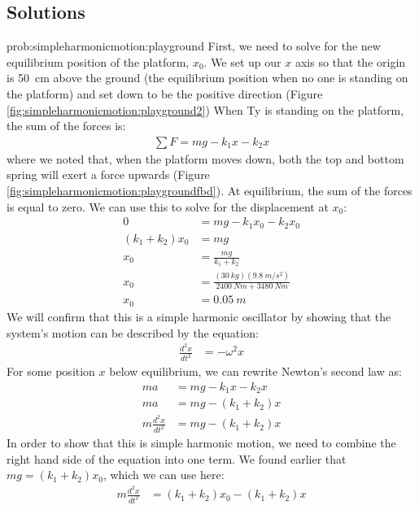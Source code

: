 \subsection{Solutions}
\begin{solution}{prob:simpleharmonicmotion:playground}\label{soln:simpleharmonicmotion:playground}
First, we need to solve for the new equilibrium position of the platform, $x_0$. We set up our $x$ axis so that the origin is \SI{50}{cm} above the ground (the equilibrium position when no one is standing on the platform) and set down to be the positive direction (Figure \ref{fig:simpleharmonicmotion:playground2})
When Ty is standing on the platform, the sum of the forces is:
\begin{align*}
\sum F=mg-k_1x-k_2x
\end{align*}
where we noted that, when the platform moves down, both the top and bottom spring will exert a force upwards (Figure \ref{fig:simpleharmonicmotion:playgroundfbd}). 
At equilibrium, the sum of the forces is equal to zero. 
We can use this to solve for the displacement at $x_0$:
\begin{align*}
0&=mg-k_1x_0-k_2x_0\\
(k_1+k_2)x_0&=mg\\
x_0&=\frac{mg}{k_1+k_2}\\
x_0&=\frac{(\SI{30}{kg})(\SI{9.8}{m/s^2})}{\SI{2400}{Nm}+\SI{3480}{Nm}}\\
x_0&=\SI{0.05}{m}
\end{align*}
We will confirm that this is a simple harmonic oscillator by showing that the system's motion can be described by the equation:
\begin{align*}
\frac{d^2x}{dt^2}&=-\omega^2x
\end{align*}
For some position $x$ below equilibrium, we can rewrite Newton's second law as:
\begin{align*}
ma&=mg-k_1x-k_2x\\
ma&=mg-(k_1+k_2)x\\
m\frac{d^2x}{dt^2}&=mg-(k_1+k_2)x
\end{align*}
In order to show that this is simple harmonic motion, we need to combine the right hand side of the equation into one term. We found earlier that $mg=(k_1+k_2)x_0$, which we can use here:
\begin{align*}
m\frac{d^2x}{dt^2}&=(k_1+k_2)x_0-(k_1+k_2)x\\

\end{align*}
\end{solution}
